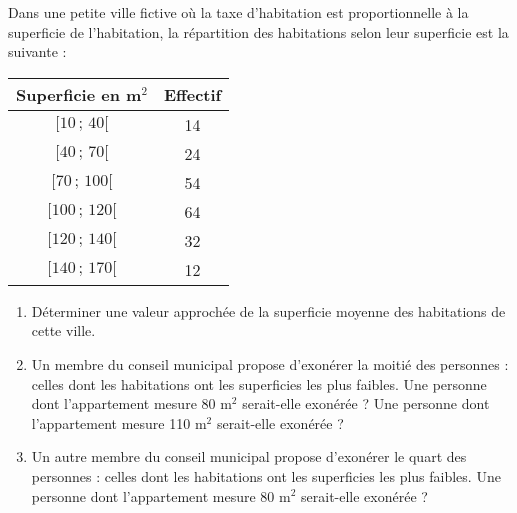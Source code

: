 \begin{exo}
Dans une petite ville fictive où la taxe d'habitation est proportionnelle à la superficie de
l'habitation, la répartition des habitations selon leur superficie est la suivante :
\begin{center}
\begin{tabular}{|c|c|}
\hline
Superficie en m$^2$ & Effectif \\ \hline
$[10\,;\,40[$ & 14 \\ \hline
$[40\,;\,70[$ & 24 \\ \hline
$[70\,;\,100[$ & 54 \\ \hline
$[100\,;\,120[$ & 64 \\ \hline
$[120\,;\,140[$ & 32 \\ \hline
$[140\,;\,170[$ & 12 \\ \hline
\end{tabular}
\end{center}
\begin{enumerate}
	\item Déterminer une valeur approchée de la superficie moyenne des
habitations de cette ville.
\item Un membre du conseil municipal propose d'exonérer la moitié des personnes : celles dont les
habitations ont les superficies les plus faibles. Une personne dont
l'appartement mesure 80 m$^2$ serait-elle exonérée ? Une personne dont
l'appartement mesure 110 m$^2$ serait-elle exonérée ?
\item Un autre membre du conseil municipal propose d'exonérer le quart des personnes : celles dont les habitations ont les superficies les
plus faibles. Une personne dont l'appartement mesure 80 m$^2$ serait-elle exonérée ?
\end{enumerate}%
\end{exo}

\sautpage

